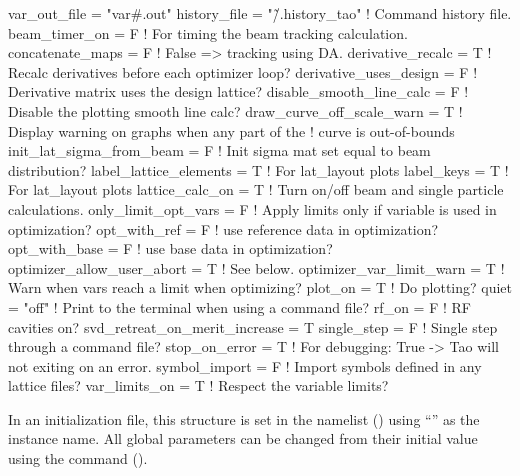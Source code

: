 {{{{{{{{\begin{example}
  var_out_file  = "var#.out"
  history_file = "\~/.history_tao"  ! Command history file.
  beam_timer_on = F                ! For timing the beam tracking calculation.
  concatenate_maps = F             ! False => tracking using DA.
  derivative_recalc = T            ! Recalc derivatives before each optimizer loop?
  derivative_uses_design = F       ! Derivative matrix uses the design lattice?
  disable_smooth_line_calc = F     ! Disable the plotting smooth line calc?
  draw_curve_off_scale_warn = T    ! Display warning on graphs when any part of the 
                                   !   curve is out-of-bounds
  init_lat_sigma_from_beam = F     ! Init sigma mat set equal to beam distribution? 
  label_lattice_elements = T       ! For lat_layout plots
  label_keys = T                   ! For lat_layout plots
  lattice_calc_on = T              ! Turn on/off beam and single particle calculations.
  only_limit_opt_vars = F          ! Apply limits only if variable is used in optimization?
  opt_with_ref = F                 ! use reference data in optimization?
  opt_with_base = F                ! use base data in optimization?
  optimizer_allow_user_abort = T   ! See below.
  optimizer_var_limit_warn = T     ! Warn when vars reach a limit when optimizing?
  plot_on = T                      ! Do plotting?
  quiet = "off"                    ! Print to the terminal when using a command file?
  rf_on = F                        ! RF cavities on?
  svd_retreat_on_merit_increase = T    
  single_step = F                  ! Single step through a command file?
  stop_on_error = T                ! For debugging: True -> Tao will not exiting on an error.
  symbol_import = F                ! Import symbols defined in any lattice files?
  var_limits_on = T                ! Respect the variable limits?
\end{example}

In an initialization file, this structure is set in the  namelist ()
using ``'' as the instance name. All global parameters can be changed from their initial
value using the  command ().

}}}}}}}}
